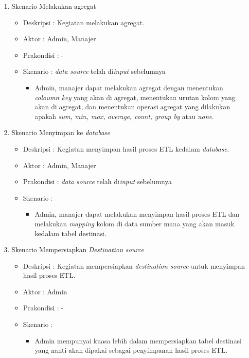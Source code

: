 \begin{enumerate}
			\item Skenario Melakukan agregat
		{\renewcommand\labelitemi{}
		\begin{itemize}
			\item Deskripsi		: Kegiatan melakukan agregat.
			\item Aktor				: Admin, Manajer 
			\item Prakondisi	: -
			\item Skenario		: \textit{data source} telah di\textit{input} sebelumnya
				\begin{itemize}
					\item Admin, manajer dapat melakukan agregat dengan menentukan \textit{coloumn key} yang akan di agregat, menentukan urutan kolom yang akan di agregat, dan menentukan operasi agregat yang dilakukan apakah \textit{sum, min, max, average, count, group by} atau \textit{none}.
				\end{itemize}
		\end{itemize}
		}
		
		\item Skenario Menyimpan ke \textit{database}
		{\renewcommand\labelitemi{}
		\begin{itemize}
			\item Deskripsi		: Kegiatan menyimpan hasil proses ETL kedalam \textit{database}.
			\item Aktor				: Admin, Manajer 
			\item Prakondisi	: \textit{data source} telah di\textit{input} sebelumnya
			\item Skenario		:
				\begin{itemize}
					\item Admin, manajer dapat melakukan menyimpan hasil proses ETL dan melakukan \textit{mapping} kolom di data sumber mana yang akan masuk kedalam tabel destinasi.
				\end{itemize}
		\end{itemize}
		}
		
		\item Skenario Mempersiapkan \textit{Destination source} 
		{\renewcommand\labelitemi{}
		\begin{itemize}
			\item Deskripsi		: Kegiatan mempersiapkan \textit{destination source} untuk menyimpan hasil proses ETL.
			\item Aktor				: Admin
			\item Prakondisi	: -
			\item Skenario		:
				\begin{itemize}
					\item Admin mempunyai kuasa lebih dalam mempersiapkan tabel destinasi yang nanti akan dipakai sebagai penyimpanan hasil proses ETL.
				\end{itemize}
		\end{itemize}
		}
\end{enumerate}

